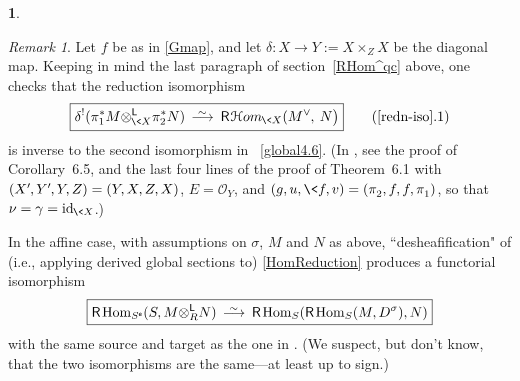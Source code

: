 \documentclass{compositio}
\theoremstyle{plain}
\theoremstyle{definition}
\newtheorem{cosa}[thm]{}
\theoremstyle{remark}
\newtheorem{subrem}[equation]{Remark}
\numberwithin{equation}{thm}
\begin{document}
\begin{cosa}
\begin{subrem}\label{redn-iso}
Let $f$ be as in \ref{Gmap}, and let $\delta\colon X\to Y{\!:=} X\times_Z X$ be the diagonal map. Keeping in mind the last paragraph of section~\ref{RHom^qc} above, one checks that the reduction isomorphism \cite[Corollary 6.5]{AILN} {}
\begin{equation*}\label{HomReduction}
\boxed{\delta^!(\pi_1^*M{\otimes^{\mathsf L}_{{{\mkern-1mu}\<X}}}\pi_2^*N){{\mkern8mu\longrightarrow \mkern-25.5mu{}^\sim\mkern17mu}} {\mathsf R}{\mkern1mu}{{\mathcal H} om}_{{{\mkern-1mu}\<X}}(M^\vee{\mkern-1mu},\>N\big)}\\[-1pt]
\tag{\ref{redn-iso}.1}
\end{equation*}
is inverse to the second isomorphism in ~\ref{global4.6}. (In \cite{AILN}, see the proof of Corollary~6.5, and the last  four lines of the proof of Theorem~6.1 with $(X'{\mkern-1mu},Y'{\mkern-1mu},Y,Z)=(Y,X,Z,X)$, $E={\mathcal O_Y}$, and
$(g,u,\<f,v)=(\pi^{}_2, f, f, \pi^{}_1)$, so that $\nu=\gamma=\operatorname{id}_{{{\mkern-1mu}\<X}}$.)

In the affine case, with assumptions on $\sigma$, $M$ and $N$ as above, ``desheafification" of (i.e., applying derived global sections to) \eqref{HomReduction} produces a functorial  isomorphism
\[
\boxed{{\mathsf R}{\mkern-1mu}\operatorname{Hom}_{{{S}^{\mathsf e}}}(S, M{\otimes^{\mathsf L}_{{R}}} N){{\mkern8mu\longrightarrow \mkern-25.5mu{}^\sim\mkern17mu}}{\mathsf R}{\mkern-1mu}\operatorname{Hom}_S({\mathsf R}{\mkern-1mu}\operatorname{Hom}_S(M,D^\sigma),N)}
\]
with the same source and target as the one in \cite[p.\,736, Theorem 1]{AILN}. (We suspect, but
don't know, that the two isomorphisms are the same---at least up to sign.)
\end{subrem}

\end{cosa}

\medskip
\end{document}
